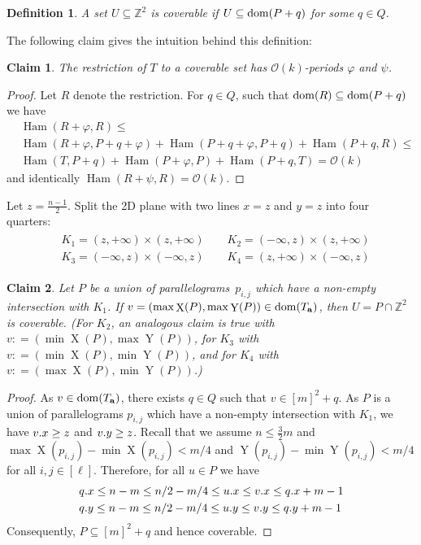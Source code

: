 \documentclass[twoside,leqno]{article}
\newtheorem{definition}{Definition}[section]
\newtheorem{claim}{Claim}[section]
\newcommand{\Z}{\mathbb{Z}}
\renewcommand{\O}{\mathcal{O}}
\newcommand{\Ta}{T_\mathbf{a}}
\renewcommand{\phi}{\varphi}
\DeclareMathOperator*{\X}{X}
\DeclareMathOperator*{\Y}{Y}
\DeclareMathOperator*{\Ham}{Ham}
\begin{document}
\begin{definition}
A set $U \subseteq \Z^2$ is \emph{coverable} if $U \subseteq \operatorname*{dom}(P + q)$ for some $q \in Q$.
\end{definition}

The following claim gives the intuition behind this definition:

\begin{claim}\label{coverable is periodic}
	The restriction of $T$ to a coverable set has $\O(k)$-periods $\phi$ and $\psi$.
\end{claim}	
	\begin{proof}
		Let $R$ denote the restriction. For $q \in Q$, such that $\operatorname*{dom}(R) \subseteq \operatorname*{dom}(P + q)$ we have
\begin{align*}
&\Ham(R + \phi, R) \le \\
&\Ham(R + \phi, P + q + \phi) + \Ham(P + q + \phi, P + q) + \Ham(P + q, R) \le \\
&\Ham(T, P + q) + \Ham(P + \phi, P) + \Ham(P + q, T) = \O(k)
\end{align*}
and identically $\Ham(R + \psi, R) = \O(k)$.
\end{proof}

Let $z = \frac{n - 1}{2}$. Split the 2D plane with two lines $x = z$ and $y = z$ into four quarters:
\begin{align}
\label{eq:quarters}
\begin{split}
&K_1 = (z, +\infty) \times (z, +\infty) \quad\quad K_2 = (-\infty, z) \times (z, +\infty)\\
&K_3 = (-\infty, z) \times (-\infty, z) \quad\quad K_4 = (z, +\infty) \times (-\infty, z)
\end{split}
\end{align}


\newcommand{\I}{\mathcal{I}}
\newcommand{\G}{\mathcal{G}}
\newcommand{\C}{\mathcal{C}}

\begin{claim}\label{coverable}
Let $P$ be a union of parallelograms~$p_{i,j}$ which have a non-empty intersection with $K_1$. If $v = (\max \X(P), \max \Y(P)) \in \d{\Ta}$, then $U = P \cap \Z^2$ is coverable. (For $K_2$, an analogous claim is true with $v: = (\min \X(P), \max \Y(P))$, for $K_3$ with $v : = (\min \X(P), \min \Y(P))$, and for $K_4$ with $v : = (\max \X(P), \min \Y(P))$.)
\end{claim}
\begin{proof}
As $v \in \d{\Ta}$, there exists $q \in Q$ such that $v \in [m]^2 + q$. As $P$ is a union of parallelograms $p_{i,j}$ which have a non-empty intersection with $K_1$, we have $v.x \ge z$ and $v.y \ge z$. Recall that we assume $n \le \frac{3}{2} m$ and $\max \X(p_{i, j}) - \min \X(p_{i, j}) < m / 4$ and $\Y(p_{i, j}) - \min \Y(p_{i, j}) < m / 4$ for all $i, j \in [\ell]$. Therefore, for all $u \in P$ we have
\begin{align*}
&q.x \le n-m \le n/2-m/4 \le u.x \le v.x \le q.x + m-1\\
&q.y \le n-m \le n/2-m/4 \le u.y \le v.y \le q.y + m-1 
\end{align*}
\noindent Consequently, $P \subseteq [m]^2+q$ and hence coverable.
\end{proof}
\end{document}
